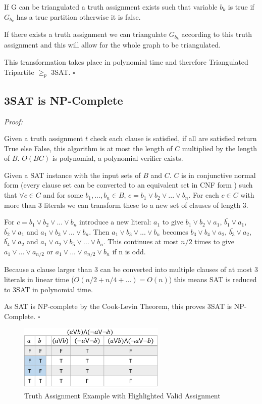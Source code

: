 \documentclass[a4paper,11pt]{report}
\begin{document}
If G can be triangulated a truth assignment exists such that variable $b_k$ is true if $G_{b_k}$ has a true partition otherwise it is false.

If there exists a truth assignment we can triangulate $G_{b_k}$ according to this truth assignment and this will allow for the whole graph to be triangulated.

This transformation takes place in polynomial time and therefore Triangulated Tripartite $\geq_p$ 3SAT. $\square$

\subsection{3SAT is NP-Complete}

\textit{Proof:}

Given a truth assignment $t$ check each clause is satisfied, if all are satisfied return True else False, this algorithm is at most the length of $C$ multiplied by the length of $B$. $O(BC)$ is polynomial, a polynomial verifier exists.

Given a SAT instance with the input sets of $B$ and $C$. $C$ is in conjunctive normal form (every clause set can be converted to an equivalent set in CNF form ) such that $\forall c \in C$ and for some $b_1, ... ,b_n \in B$, $c = b_1 \lor b_2
\lor ... \lor b_n$. For each $c \in C$ with more than 3 literals we can transform these to a new set of clauses of length 3.

For $c = b_1 \lor b_2 \lor ... \lor b_n$ introduce a new literal: $a_1$ to give $b_1 \lor b_2 \lor a_1$, $\bar{b_1} \lor a_1$, $\bar{b_2} \lor a_1$ and $a_1 \lor b_3 \lor ... \lor b_n$. Then $a_1 \lor b_3 \lor ... \lor b_n$ becomes $b_3 \lor b_4 \lor a_2$, $\bar{b_3} \lor a_2$, $\bar{b_4} \lor a_2$ and $a_1 \lor a_2 \lor b_5 \lor ... \lor b_n$. This continues at most $n/2$ times to give $a_1 \lor ... \lor a_{n/2}$ or $a_1 \lor ... \lor a_{n/2} \lor b_n$ if n is odd.

Because a clause larger than 3 can be converted into multiple clauses of at most 3 literals in linear time ($O(n/2 + n/4 + ...) = O(n)$) this means SAT is reduced to 3SAT in polynomial time.

As SAT is NP-complete by the Cook-Levin Theorem, this proves 3SAT is NP-Complete. $\square$
		
\begin{figure}
\begin{center}
		\includegraphics[width=70mm]{figures/sat_example.png}
\end{center}
		\caption{Truth Assignment Example with Highlighted Valid Assignment}
\end{figure}
\end{document}
